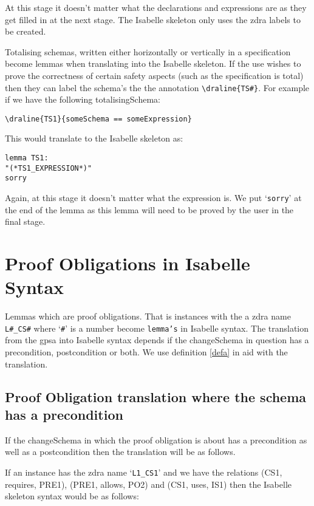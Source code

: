 At this stage it doesn't matter what the declarations and expressions are as they get filled in at the next stage. The Isabelle skeleton only uses the \gls{zdra} labels to be created.

Totalising schemas, written either horizontally or vertically in a specification become lemmas when translating into the Isabelle skeleton. If the use wishes to prove the correctness of certain safety aspects (such as the specification is total) then they can label the schema's the the annotation \verb|\draline{TS#}|. For example if we have the following totalisingSchema:

\verb|\draline{TS1}{someSchema == someExpression}|

This would translate to the Isabelle skeleton as:

\begin{verbatim}
lemma TS1:
"(*TS1_EXPRESSION*)"
sorry
\end{verbatim}

Again, at this stage it doesn't matter what the expression is. We put `\texttt{sorry}' at the end of the lemma as this lemma will need to be proved  by the user in the final stage.

\section{Proof Obligations in Isabelle Syntax}

Lemmas which are proof obligations. That is instances with the a \gls{zdra} name \texttt{L\#\_CS\#} where `\texttt{\#}' is a number become \texttt{lemma's} in Isabelle syntax. The translation from the \gls{gpsa} into Isabelle syntax depends if the changeSchema in question has a precondition, postcondition or both. We use definition \ref{defa} in aid with the translation.

\subsection{Proof Obligation translation where the schema has a precondition}

If the changeSchema in which the proof obligation is about has a precondition as well as a postcondition then the translation will be as follows. 

If an instance has the \gls{zdra} name `\texttt{L1\_CS1}' and we have the relations (CS1, requires, PRE1), (PRE1, allows, PO2) and (CS1, uses, IS1) then the Isabelle skeleton syntax would be as follows:

